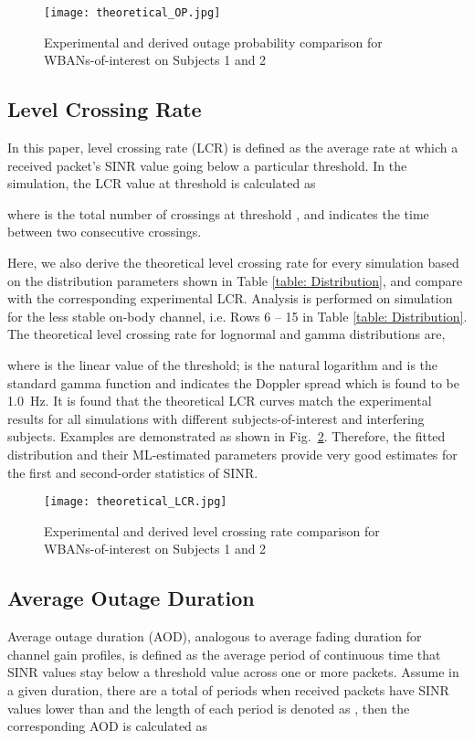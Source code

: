 \documentclass[12pt,draftcls,a4paper,onecolumn,journal]{IEEEtran}
\begin{document}
\begin{figure}[]
\centering
\texttt{[image: theoretical\_OP.jpg]}
\caption{Experimental and derived outage probability comparison for WBANs-of-interest on Subjects 1 and 2}
\label{fig:Theoretical OP}
\end{figure}

\subsection{Level Crossing Rate}

In this paper, level crossing rate (LCR) is defined as the average rate at which a received packet's SINR value going below a particular threshold. In the simulation, the LCR value at threshold  is calculated as


where  is the total number of crossings at threshold , and  indicates the time between two consecutive crossings.

Here, we also derive the theoretical level crossing rate for every simulation based on the distribution parameters shown in Table \ref{table: Distribution}, and compare with the corresponding experimental LCR. Analysis is performed on simulation for the less stable on-body channel, i.e. Rows 6 -- 15 in Table \ref{table: Distribution}. The theoretical level crossing rate for lognormal and gamma distributions are,


where  is the linear value of the threshold;  is the natural logarithm and  is the standard gamma function and  indicates the Doppler spread which is found to be 1.0~Hz. It is found that the theoretical LCR curves match the experimental results for all simulations with different subjects-of-interest and interfering subjects. Examples are demonstrated as shown in Fig.~\ref{fig: Sample Theoretical LCR fit for Subject 1 an 2}. Therefore, the fitted distribution and their ML-estimated parameters provide very good estimates for the first and second-order statistics of SINR.

\begin{figure}[]
\centering
\texttt{[image: theoretical\_LCR.jpg]}
\caption{Experimental and derived level crossing rate comparison for WBANs-of-interest on Subjects 1 and 2}
\label{fig: Sample Theoretical LCR fit for Subject 1 an 2}
\end{figure}



\subsection{Average Outage Duration}
Average outage duration (AOD), analogous to average fading duration for channel gain profiles, is defined as the average period of continuous time that SINR values stay below a threshold value  across one or more packets. Assume in a given duration, there are a total of  periods when received packets have SINR values lower than  and the length of each period is denoted as , then the corresponding AOD is calculated as
\end{document}
